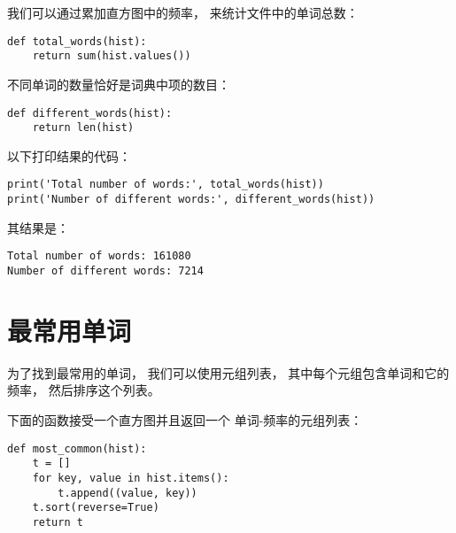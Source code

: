 
我们可以通过累加直方图中的频率， 来统计文件中的单词总数：

\begin{lstlisting}
def total_words(hist):
    return sum(hist.values())
\end{lstlisting}

%

不同单词的数量恰好是词典中项的数目：

\begin{lstlisting}
def different_words(hist):
    return len(hist)
\end{lstlisting}


以下打印结果的代码：

\begin{lstlisting}
print('Total number of words:', total_words(hist))
print('Number of different words:', different_words(hist))
\end{lstlisting}


其结果是：

\begin{lstlisting}
Total number of words: 161080
Number of different words: 7214
\end{lstlisting}

%
\section{最常用单词}


为了找到最常用的单词， 我们可以使用元组列表， 其中每个元组包含单词和它的频率， 然后排序这个列表。  

下面的函数接受一个直方图并且返回一个
单词-频率的元组列表：

\begin{lstlisting}
def most_common(hist):
    t = []
    for key, value in hist.items():
        t.append((value, key))
    t.sort(reverse=True)
    return t
\end{lstlisting}


